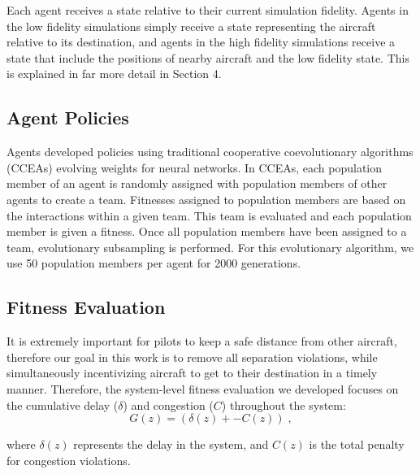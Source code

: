 \documentclass{sig-alternate}
\begin{document}
Each agent receives a state relative to their current simulation fidelity. Agents in the low fidelity simulations simply receive a state representing the aircraft relative to its destination, and agents in the high fidelity simulations receive a state that include the positions of nearby aircraft and the low fidelity state. This is explained in far more detail in Section 4. 

\subsection{Agent Policies}
Agents developed policies using traditional cooperative coevolutionary algorithms (CCEAs) evolving weights for neural networks. In CCEAs, each population member of an agent is randomly assigned with population members of other agents to create a team. Fitnesses assigned to population members are based on the interactions within a given team.  This team is evaluated and each population member is given a fitness. Once all population members have been assigned to a team, evolutionary subsampling is performed. For this evolutionary algorithm, we use 50 population members per agent for 2000 generations. 



\subsection{Fitness Evaluation}
It is extremely important for pilots to keep a safe distance from other aircraft, therefore our goal in this work is to remove all separation violations, while simultaneously incentivizing aircraft to get to their destination in a timely manner. Therefore, the system-level fitness evaluation we developed focuses on the cumulative delay ($\delta$) and congestion ($C$) throughout the system:
%
\begin{equation}
G(z) = (\delta(z) + -C(z))\;,
\end{equation}

where $\delta(z)$ represents the delay in the system, and $C(z)$ is the total penalty for congestion violations.
\end{document}
